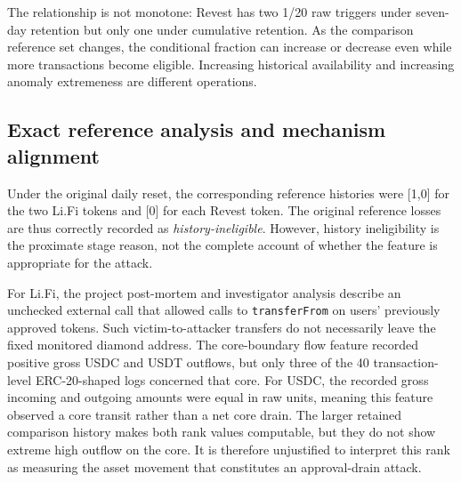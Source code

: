 \documentclass[preprint,12pt,authoryear]{elsarticle}
\begin{document}
The relationship is not monotone: Revest has two 1/20 raw triggers under seven-day retention but only one under cumulative retention. As the comparison reference set changes, the conditional fraction can increase or decrease even while more transactions become eligible. Increasing historical availability and increasing anomaly extremeness are different operations.

\subsection{Exact reference analysis and mechanism alignment}\label{exact-reference-analysis-and-mechanism-alignment}

\begin{table}[htbp]\centering\scriptsize\caption{Reference-execution evidence; cumulative within-window rank is a retrospective diagnostic.}\label{tab:references}
\end{table}

Under the original daily reset, the corresponding reference histories were {[}1,0{]} for the two Li.Fi tokens and {[}0{]} for each Revest token. The original reference losses are thus correctly recorded as \emph{history-ineligible}. However, history ineligibility is the proximate stage reason, not the complete account of whether the feature is appropriate for the attack.

For Li.Fi, the project post-mortem and investigator analysis describe an unchecked external call that allowed calls to \texttt{transferFrom} on users' previously approved tokens. Such victim-to-attacker transfers do not necessarily leave the fixed monitored diamond address. The core-boundary flow feature recorded positive gross USDC and USDT outflows, but only three of the 40 transaction-level ERC-20-shaped logs concerned that core. For USDC, the recorded gross incoming and outgoing amounts were equal in raw units, meaning this feature observed a core transit rather than a net core drain. The larger retained comparison history makes both rank values computable, but they do not show extreme high outflow on the core. It is therefore unjustified to interpret this rank as measuring the asset movement that constitutes an approval-drain attack.
\end{document}
